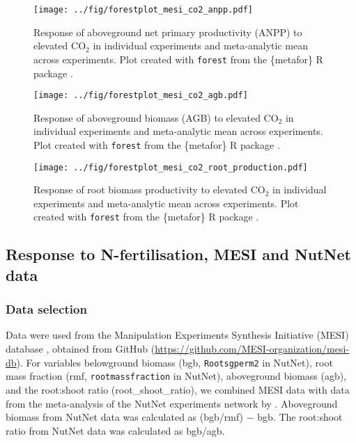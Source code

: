 \documentclass{myreport}
\begin{document}
\begin{figure}[h]
\centering
\texttt{[image: ../fig/forestplot\_mesi\_co2\_anpp.pdf]}
\caption{Response of aboveground net primary productivity (ANPP) to elevated CO$_2$ in individual experiments and meta-analytic mean across experiments. Plot created with \texttt{forest} from the \{metafor\} R package \cite{viechtbauer_conducting_2010}.}
\end{figure}

\begin{figure}[h]
\centering
\texttt{[image: ../fig/forestplot\_mesi\_co2\_agb.pdf]}
\caption{Response of aboveground biomass (AGB) to elevated CO$_2$ in individual experiments and meta-analytic mean across experiments. Plot created with \texttt{forest} from the \{metafor\} R package \cite{viechtbauer_conducting_2010}.}
\end{figure}

\begin{figure}[h]
\centering
\texttt{[image: ../fig/forestplot\_mesi\_co2\_root\_production.pdf]}
\caption{Response of root biomass productivity to elevated CO$_2$ in individual experiments and meta-analytic mean across experiments. Plot created with \texttt{forest} from the \{metafor\} R package \cite{viechtbauer_conducting_2010}.}
\end{figure}

\clearpage

\subsection{Response to N-fertilisation, MESI and NutNet data}

\subsubsection{Data selection}

Data were used from the Manipulation Experiments Synthesis Initiative (MESI) database \citep{vansundert_when_2023}, obtained from GitHub (\url{https://github.com/MESI-organization/mesi-db}). For variables belowground biomass (bgb, \texttt{Rootsgperm2} in NutNet), root mass fraction (rmf, \texttt{rootmassfraction} in NutNet), aboveground biomass (agb), and the root:shoot ratio (root\_shoot\_ratio), we combined MESI data with data from the meta-analysis of the NutNet experiments network by \citet{cleland_belowground_2019}. Aboveground biomass from NutNet data was calculated as (bgb/rmf) $-$ bgb. The root:shoot ratio from NutNet data was calculated as bgb/agb. 
\end{document}

